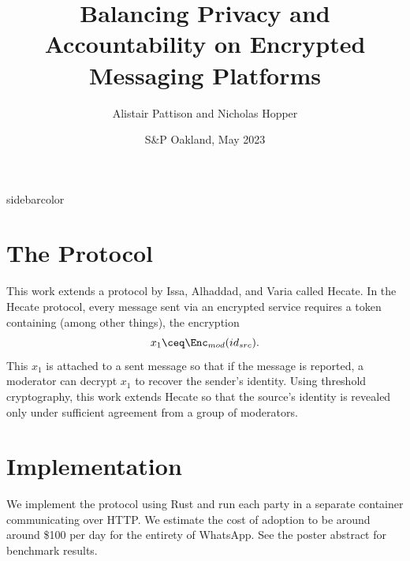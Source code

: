 \documentclass{ali-poster}
\title{Balancing Privacy and Accountability on Encrypted  Messaging Platforms}
\author{Alistair Pattison and Nicholas Hopper}
\date{S\&P Oakland, May 2023}
\begin{document}
% 
% 
\noindent%
\begin{panel}{\sidebarwidth}{sidebarcolor}

	\section*{The Protocol}

	This work extends a protocol by Issa, Alhaddad, and Varia called Hecate. In the Hecate protocol, every message sent via an encrypted service requires a token containing (among other things), the encryption
	\begin{equation*}
		x_1 \ceq \Enc_{mod}(id_{src}).
	\end{equation*}
	This $x_1$ is attached to a sent message so that if the message is reported, a moderator can decrypt $x_1$ to recover the sender's identity.
	Using threshold cryptography, this work extends Hecate so that the source's identity is revealed only under sufficient agreement from a group of moderators.

	\vspace{1cm}

	\begin{algorithmic}[1]
	\end{algorithmic}

	\vspace{1cm}

	\begin{algorithmic}[1]
	\end{algorithmic}

	\medskip

	\section*{Implementation}

	We implement the protocol using Rust and run each party in a separate container communicating over HTTP. We estimate the cost of adoption to be around around \$100 per day for the entirety of WhatsApp. See the poster abstract for benchmark results.

\end{panel}%
\end{document}
